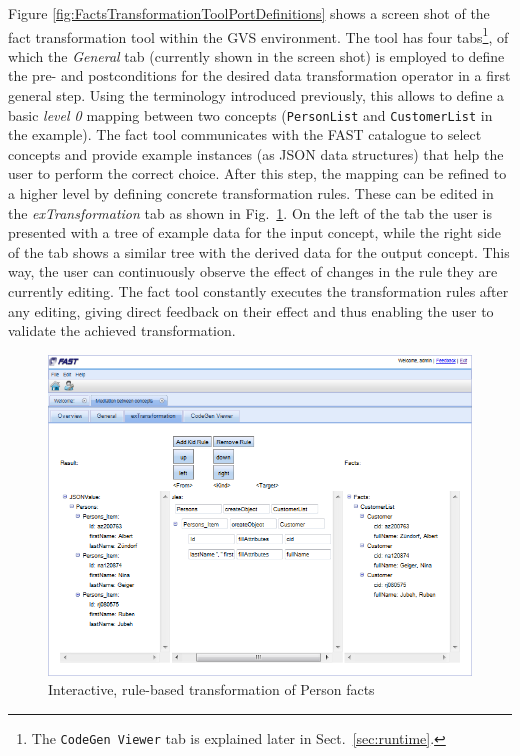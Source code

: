 Figure \ref{fig:FactsTransformationToolPortDefinitions} shows a screen shot of the  fact transformation tool within the GVS environment. The tool has four tabs\footnote{The \texttt{CodeGen Viewer} tab is explained later in Sect.~\ref{sec:runtime}.}, of which the \textit{General} tab (currently shown in the screen shot) is employed to define the pre- and postconditions for the desired data transformation operator in a first general step. 
Using the terminology introduced previously, this allows to define a basic \emph{level 0} mapping between two concepts (\texttt{PersonList} and \texttt{CustomerList} in the example).
The fact tool communicates with the FAST catalogue to select concepts and provide example instances (as JSON data structures) that help the user to perform the correct choice.
After this step, the mapping can be refined to a higher level by defining concrete transformation rules. These can be edited in the \emph{exTransformation} tab as shown in Fig.~\ref{fig:FactsTransformationToolTransformationRules}. On the left of the tab the user is presented with a tree of example data for the input concept, while the right side of the tab shows a similar tree with the derived data for the output concept. This way, the user can continuously observe the effect of changes in the rule they are currently editing. The fact tool constantly executes the transformation rules after any editing, giving direct feedback on their effect and thus enabling the user to validate the achieved transformation. 

\begin{figure}
  \begin{center}
\includegraphics[width=\linewidth]{images/FactsTransformationToolGVSWithTransformationRules.png}
    \caption{Interactive, rule-based transformation of Person facts}
    \label{fig:FactsTransformationToolTransformationRules}
  \end{center}
\end{figure}

